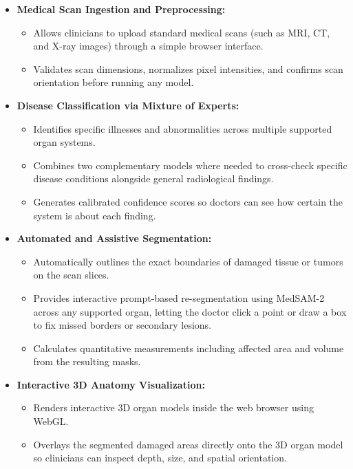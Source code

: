 \documentclass[12pt,a4paper]{report}
\begin{document}
\begin{itemize}[leftmargin=1.2em]
    \item \textbf{Medical Scan Ingestion and Preprocessing:}
    \begin{itemize}[leftmargin=1.2em]
        \item Allows clinicians to upload standard medical scans (such as MRI, CT, and X-ray images) through a simple browser interface.
        \item Validates scan dimensions, normalizes pixel intensities, and confirms scan orientation before running any model.
    \end{itemize}
    \item \textbf{Disease Classification via Mixture of Experts:}
    \begin{itemize}[leftmargin=1.2em]
        \item Identifies specific illnesses and abnormalities across multiple supported organ systems.
        \item Combines two complementary models where needed to cross-check specific disease conditions alongside general radiological findings.
        \item Generates calibrated confidence scores so doctors can see how certain the system is about each finding.
    \end{itemize}
    \item \textbf{Automated and Assistive Segmentation:}
    \begin{itemize}[leftmargin=1.2em]
        \item Automatically outlines the exact boundaries of damaged tissue or tumors on the scan slices.
        \item Provides interactive prompt-based re-segmentation using MedSAM-2 across any supported organ, letting the doctor click a point or draw a box to fix missed borders or secondary lesions.
        \item Calculates quantitative measurements including affected area and volume from the resulting masks.
    \end{itemize}
    \item \textbf{Interactive 3D Anatomy Visualization:}
    \begin{itemize}[leftmargin=1.2em]
        \item Renders interactive 3D organ models inside the web browser using WebGL.
        \item Overlays the segmented damaged areas directly onto the 3D organ model so clinicians can inspect depth, size, and spatial orientation.

\end{itemize}
\end{itemize}
\end{document}
